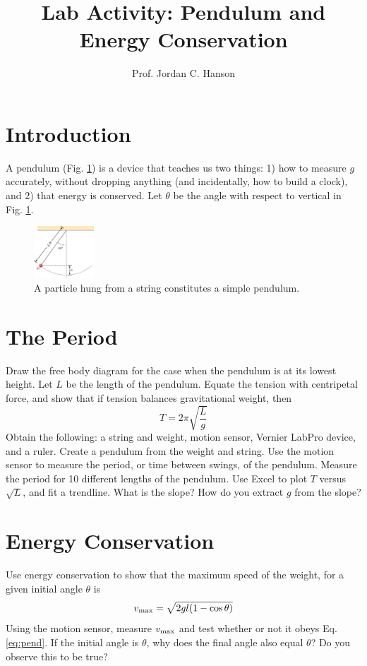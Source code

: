 \documentclass{article}
\begin{document}
\title{Lab Activity: Pendulum and Energy Conservation}
\author{Prof. Jordan C. Hanson}

\maketitle

\section{Introduction}
A pendulum (Fig. \ref{fig:pend}) is a device that teaches us two things: 1) how to measure $g$ accurately, without dropping anything (and incidentally, how to build a clock), and 2) that energy is conserved. Let $\theta$ be the angle with respect to vertical in Fig. \ref{fig:pend}.
\begin{figure}[ht]
\centering
\includegraphics[width=0.2\textwidth]{pend.png}
\caption{\label{fig:pend} A particle hung from a string constitutes a simple pendulum.}
\end{figure}

\section{The Period}

Draw the free body diagram for the case when the pendulum is at its lowest height.  Let $L$ be the length of the pendulum.  Equate the tension with centripetal force, and show that if tension balances gravitational weight, then
\begin{equation}
T = 2\pi \sqrt{\frac{L}{g}}
\end{equation}
Obtain the following: a string and weight, motion sensor, Vernier LabPro device, and a ruler.  Create a pendulum from the weight and string.  Use the motion sensor to measure the period, or time between swings, of the pendulum.  Measure the period for 10 different lengths of the pendulum.  Use Excel to plot $T$ versus $\sqrt{L}$, and fit a trendline.  What is the slope?  How do you extract $g$ from the slope? \\ \vspace{2cm}
\section{Energy Conservation}
Use energy conservation to show that the maximum speed of the weight, for a given initial angle $\theta$ is
\begin{equation}
v_{\rm max} = \sqrt{2gl(1-\cos\theta)} \label{eq:pend}
\end{equation}
Using the motion sensor, measure $v_{\rm max}$ and test whether or not it obeys Eq. \ref{eq:pend}.  If the initial angle is $\theta$, why does the final angle also equal $\theta$?  Do you observe this to be true?
\end{document}
